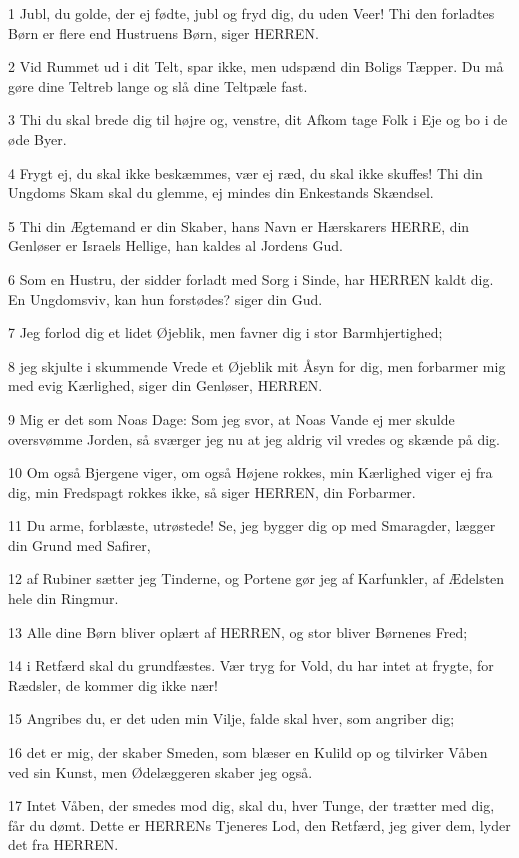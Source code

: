 \par 1 Jubl, du golde, der ej fødte, jubl og fryd dig, du uden Veer! Thi den forladtes Børn er flere end Hustruens Børn, siger HERREN.
\par 2 Vid Rummet ud i dit Telt, spar ikke, men udspænd din Boligs Tæpper. Du må gøre dine Teltreb lange og slå dine Teltpæle fast.
\par 3 Thi du skal brede dig til højre og, venstre, dit Afkom tage Folk i Eje og bo i de øde Byer.
\par 4 Frygt ej, du skal ikke beskæmmes, vær ej ræd, du skal ikke skuffes! Thi din Ungdoms Skam skal du glemme, ej mindes din Enkestands Skændsel.
\par 5 Thi din Ægtemand er din Skaber, hans Navn er Hærskarers HERRE, din Genløser er Israels Hellige, han kaldes al Jordens Gud.
\par 6 Som en Hustru, der sidder forladt med Sorg i Sinde, har HERREN kaldt dig. En Ungdomsviv, kan hun forstødes? siger din Gud.
\par 7 Jeg forlod dig et lidet Øjeblik, men favner dig i stor Barmhjertighed;
\par 8 jeg skjulte i skummende Vrede et Øjeblik mit Åsyn for dig, men forbarmer mig med evig Kærlighed, siger din Genløser, HERREN.
\par 9 Mig er det som Noas Dage: Som jeg svor, at Noas Vande ej mer skulde oversvømme Jorden, så sværger jeg nu at jeg aldrig vil vredes og skænde på dig.
\par 10 Om også Bjergene viger, om også Højene rokkes, min Kærlighed viger ej fra dig, min Fredspagt rokkes ikke, så siger HERREN, din Forbarmer.
\par 11 Du arme, forblæste, utrøstede! Se, jeg bygger dig op med Smaragder, lægger din Grund med Safirer,
\par 12 af Rubiner sætter jeg Tinderne, og Portene gør jeg af Karfunkler, af Ædelsten hele din Ringmur.
\par 13 Alle dine Børn bliver oplært af HERREN, og stor bliver Børnenes Fred;
\par 14 i Retfærd skal du grundfæstes. Vær tryg for Vold, du har intet at frygte, for Rædsler, de kommer dig ikke nær!
\par 15 Angribes du, er det uden min Vilje, falde skal hver, som angriber dig;
\par 16 det er mig, der skaber Smeden, som blæser en Kulild op og tilvirker Våben ved sin Kunst, men Ødelæggeren skaber jeg også.
\par 17 Intet Våben, der smedes mod dig, skal du, hver Tunge, der trætter med dig, får du dømt. Dette er HERRENs Tjeneres Lod, den Retfærd, jeg giver dem, lyder det fra HERREN.

